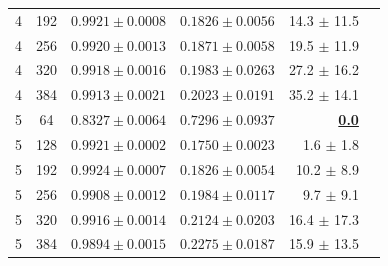 \begin{table}[ht]
\begin{tabular}{ccrrrr}
  4 & 192 & $\mathbf{0.9921 \pm 0.0008}$ & $0.1826 \pm 0.0056$ & 14.3 $\pm$ 11.5 \\
  4 & 256 & $0.9920 \pm 0.0013$ & $0.1871 \pm 0.0058$ & 19.5 $\pm$ 11.9 \\
  4 & 320 & $0.9918 \pm 0.0016$ & $0.1983 \pm 0.0263$ & 27.2 $\pm$ 16.2 \\
  4 & 384 & $0.9913 \pm 0.0021$ & $0.2023 \pm 0.0191$ & 35.2 $\pm$ 14.1 \\
\midrule
  5 & 64 & $0.8327 \pm 0.0064$ & $0.7296 \pm 0.0937$ & \underline{\textbf{0.0}} \\
  5 & 128 & $0.9921 \pm 0.0002$ & \underline{$\mathbf{0.1750 \pm 0.0023}$} & 1.6 $\pm$ 1.8 \\
  5 & 192 & $\mathbf{0.9924 \pm 0.0007}$ & $0.1826 \pm 0.0054$ & 10.2 $\pm$ 8.9 \\
  5 & 256 & $0.9908 \pm 0.0012$ & $0.1984 \pm 0.0117$ & 9.7 $\pm$ 9.1 \\
  5 & 320 & $0.9916 \pm 0.0014$ & $0.2124 \pm 0.0203$ & 16.4 $\pm$ 17.3 \\
  5 & 384 & $0.9894 \pm 0.0015$ & $0.2275 \pm 0.0187$ & 15.9 $\pm$ 13.5 \\
\bottomrule
\end{tabular}

\end{table}

